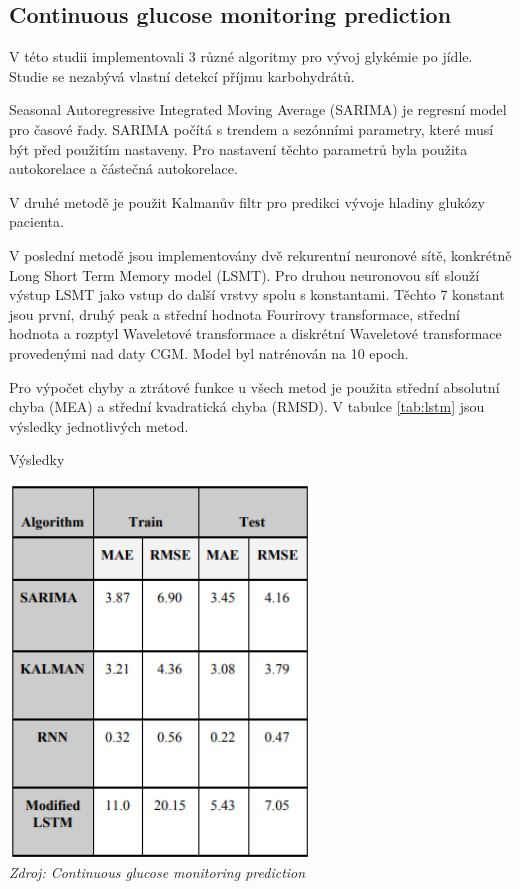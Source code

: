 \subsection{Continuous glucose monitoring prediction}

V této studii \citet{Analyza.LSTM} implementovali 3 různé algoritmy pro vývoj glykémie po jídle. Studie se nezabývá vlastní detekcí příjmu karbohydrátů.

Seasonal Autoregressive Integrated Moving Average (SARIMA) je regresní model pro časové řady. SARIMA počítá s trendem a sezónními parametry, které musí být před použitím nastaveny. Pro nastavení těchto parametrů byla použita autokorelace a částečná autokorelace.

V druhé metodě je použit Kalmanův filtr pro predikci vývoje hladiny glukózy pacienta.

V poslední metodě jsou implementovány dvě rekurentní neuronové sítě, konkrétně Long Short Term Memory model (LSMT). Pro druhou neuronovou síť slouží výstup LSMT jako vstup do další vrstvy spolu s konstantami. Těchto 7 konstant jsou první, druhý peak a střední hodnota Fourirovy transformace, střední hodnota a rozptyl Waveletové transformace a diskrétní Waveletové transformace provedenými nad daty CGM. Model byl natrénován na 10 epoch.

Pro výpočet chyby a ztrátové funkce u všech metod je použita střední absolutní chyba (MEA) a střední kvadratická chyba (RMSD). V tabulce \ref{tab:lstm} jsou výsledky jednotlivých metod.

\begin{table}[H]
\caption{Výsledky}
\label{tab:lstm}
\centering
\includegraphics[width=0.6\textwidth]{img/analyza/lstm.png}\\
\textit{Zdroj: Continuous glucose monitoring prediction \citep{Analyza.LSTM}}
\end{table}


